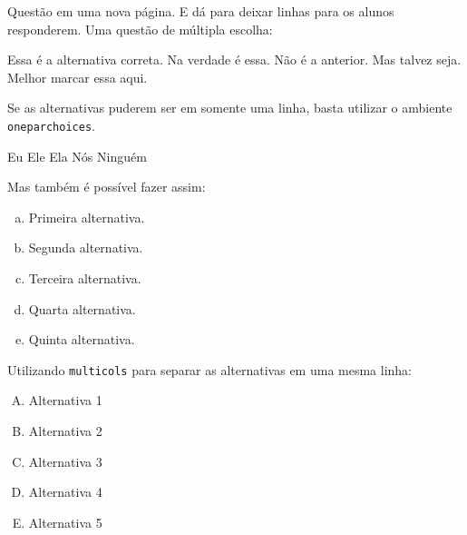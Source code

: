 \documentclass[a4paper, 11pt, addpoints]{exam}
\begin{document}
\begin{questions}
		\newpage
		\question
		Questão em uma nova página. E dá para deixar linhas para os alunos responderem.
		\fillwithlines{5cm}
		\question
		Uma questão de múltipla escolha:
			\begin{choices}
				\choice Essa é a alternativa correta.
				\choice Na verdade é essa.
				\choice Não é a anterior.
				\choice Mas talvez seja.
				\choice Melhor marcar essa aqui.
			\end{choices}
		\question
		Se as alternativas puderem ser em somente uma linha, basta utilizar o ambiente \texttt{oneparchoices}.
			\begin{oneparchoices}
				\choice Eu
				\choice Ele
				\choice Ela
				\choice Nós
				\choice Ninguém
			\end{oneparchoices}
		\question
		Mas também é possível fazer assim:
			\begin{enumerate}[a)]
				\item Primeira alternativa.
				\item Segunda alternativa.
				\item Terceira alternativa.
				\item Quarta alternativa.
				\item Quinta alternativa.
			\end{enumerate}
		\question
		Utilizando \texttt{multicols} para separar as alternativas em uma mesma linha:
			\begin{multicols}{5}
				\begin{enumerate}[(A)]
					\item Alternativa 1
					\item Alternativa 2
					\item Alternativa 3
					\item Alternativa 4
					\item Alternativa 5

\end{enumerate}
\end{multicols}
\end{questions}
\end{document}
